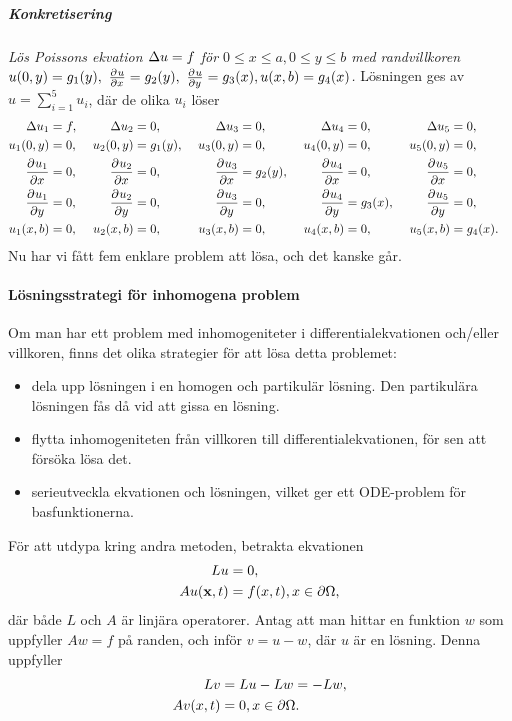 \subparagraph{Konkretisering}
\textit{
Lös Poissons ekvation $\Delta u = f$ för $0\leq x\leq a, 0\leq y\leq b$ med randvillkoren $u(0, y) = g_{1}(y),\ \pdeval{u}{x}{a, y} = g_{2}(y),\ \pdeval{u}{y}{x, 0} = g_{3}(x), u(x, b) = g_{4}(x)$.
}
Lösningen ges av $u = \sum\limits_{i = 1}^{5}u_{i}$, där de olika $u_{i}$ löser
\begin{alignat*}{7}
	\laplace{u_{1}}         &= f,&\ \laplace{u_{2}}         &= 0,       &\        \laplace{u_{3}}         &= 0,&\        \laplace{u_{4}}         &= 0,&\        \laplace{u_{5}}         &= 0,& \\
	u_{1}(0, y)             &= 0,&\ u_{2}(0, y)             &= g_{1}(y),&\ u_{3}(0, y)             &= 0,&\ u_{4}(0, y)             &= 0,&\ u_{5}(0, y)             &= 0,& \\
	\pdeval{u_{1}}{x}{a, y} &= 0,&\ \pdeval{u_{2}}{x}{a, y} &= 0,       &\ \pdeval{u_{3}}{x}{a, y} &= g_{2}(y),&\ \pdeval{u_{4}}{x}{a, y} &= 0,&\ \pdeval{u_{5}}{x}{a, y} &= 0,& \\
	\pdeval{u_{1}}{y}{x, 0} &= 0,&\ \pdeval{u_{2}}{y}{x, 0} &= 0,       &\ \pdeval{u_{3}}{y}{x, 0} &= 0,&\ \pdeval{u_{4}}{y}{x, 0} &= g_{3}(x),&\ \pdeval{u_{5}}{y}{x, 0} &= 0,& \\
	u_{1}(x, b)             &= 0,&\ u_{2}(x, b)             &= 0,       &\ u_{3}(x, b)             &= 0,&\ u_{4}(x, b)             &= 0,&\ u_{5}(x, b)             &= g_{4}(x).&
\end{alignat*}
Nu har vi fått fem enklare problem att lösa, och det kanske går.

\paragraph{Lösningsstrategi för inhomogena problem}
Om man har ett problem med inhomogeniteter i differentialekvationen och/eller villkoren, finns det olika strategier för att lösa detta problemet:
\begin{itemize}
	\item dela upp lösningen i en homogen och partikulär lösning. Den partikulära lösningen fås då vid att gissa en lösning.
	\item flytta inhomogeniteten från villkoren till differentialekvationen, för sen att försöka lösa det.
	\item serieutveckla ekvationen och lösningen, vilket ger ett ODE-problem för basfunktionerna.
\end{itemize}

För att utdypa kring andra metoden, betrakta ekvationen
\begin{align*}
	Lu            &= 0, \\
	Au(\vb{x}, t) &= f(x, t), x\in\partial \Omega,
\end{align*}
där både $L$ och $A$ är linjära operatorer. Antag att man hittar en funktion $w$ som uppfyller $Aw = f$ på randen, och inför $v = u - w$, där $u$ är en lösning. Denna uppfyller
\begin{align*}
	Lv       &= Lu - Lw = -Lw, \\
	Av(x, t) &= 0, x\in\partial \Omega.
\end{align*}

